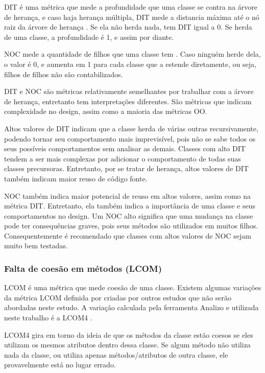 DIT é uma métrica que mede a profundidade que uma classe se contra na árvore de herança, e caso haja herança múltipla, DIT mede a distancia máxima até o nó raiz da árvore de herança \cite{chidamberkemerer}. Se ela não herda nada, tem DIT igual a 0. Se herda de uma classe, a profundidade é 1, e assim por diante. 

NOC mede a quantidade de filhos que uma classe tem \cite{chidamberkemerer}. Caso ninguém herde dela, o valor é 0, e aumenta em 1 para cada classe que a estende diretamente, ou seja, filhos de filhos não são contabilizados.

DIT e NOC são métricas relativamente semelhantes por trabalhar com a árvore de herança, entretanto tem interpretações diferentes. São métricas que indicam complexidade no design, assim como a maioria das métricas OO.

Altos valores de DIT indicam que a classe herda de várias outras recursivamente, podendo tornar seu comportamento mais imprevisível, pois não se sabe todos os seus possíveis comportamentos sem analisar as demais. Classes com alto DIT tendem a ser mais complexas por adicionar o comportamento de todas suas classes precursoras. Entretanto, por se tratar de herança, altos valores de DIT também indicam maior reuso de código fonte.

NOC também indica maior potencial de reuso em altos valores, assim como na métrica DIT. Entretanto, ela também indica a importância de uma classe e seus comportamentos no design. Um NOC alto significa que uma mudança na classe pode ter consequências graves, pois seus métodos são utilizados em muitos filhos. Consequentemente é recomendado que classes com altos valores de NOC sejam muito bem testadas.

\subsubsection{Falta de coesão em métodos (LCOM)}

LCOM é uma métrica que mede coesão de uma classe. Existem algumas variações da métrica LCOM definida por  criadas por outros estudos que não serão abordadas neste estudo. A variação calculada pela ferramenta Analizo e utilizada neste trabalho é a LCOM4 \cite{hitz1995measuring}.

LCOM4 gira em torno da ideia de que os métodos da classe estão coesos se eles utilizam os mesmos atributos dentro dessa classe. Se algum método não utiliza nada da classe, ou utiliza apenas métodos/atributos de outra classe, ele provavelmente está no lugar errado. 


